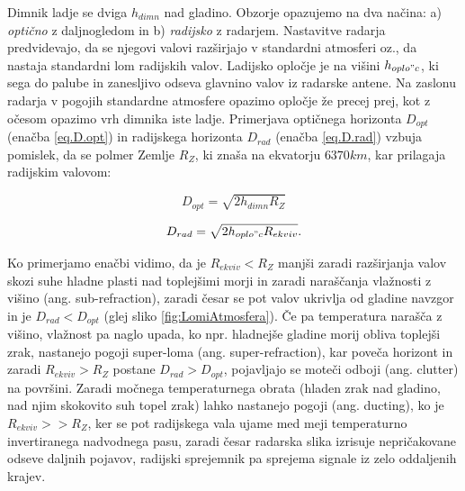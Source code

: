 Dimnik ladje se dviga $h_{dimn}$ nad gladino. Obzorje opazujemo na dva načina: a) \textit{optično} z daljnogledom in b) \textit{radijsko} z radarjem. Nastavitve radarja predvidevajo, da se njegovi valovi razširjajo v standardni atmosferi oz., da nastaja standardni lom radijskih valov. Ladijsko opločje je na višini $h_{oplo"c}$, ki sega do palube in zanesljivo odseva glavnino valov iz radarske antene. Na zaslonu radarja v pogojih standardne atmosfere opazimo opločje že precej prej, kot z očesom opazimo vrh dimnika iste ladje. Primerjava optičnega horizonta $D_{opt}$ (enačba \ref{eq.D.opt}) in radijskega horizonta $D_{rad}$ (enačba \ref{eq.D.rad}) vzbuja pomislek, da se polmer Zemlje $R_Z$, ki znaša na ekvatorju $6370km$, kar prilagaja radijskim valovom:

\begin{equation}\label{eq.D.opt}
D_{opt}=\sqrt{2h_{dimn}R_Z}
\end{equation}

\begin{equation}\label{eq.D.rad}
D_{rad}=\sqrt{2h_{oplo"c}R_{ekviv}}.
\end{equation}

Ko primerjamo enačbi vidimo, da je $R_{ekviv} < R_Z$ manjši zaradi razširjanja valov skozi suhe hladne plasti nad toplejšimi morji in zaradi naraščanja vlažnosti z višino (ang. sub-refraction), zaradi česar se pot valov ukrivlja od gladine navzgor in je $D_{rad} < D_{opt}$ (glej sliko \ref{fig:LomiAtmosfera}). Če pa temperatura narašča z višino, vlažnost pa naglo upada, ko npr. hladnejše gladine morij obliva toplejši zrak, nastanejo pogoji super-loma (ang. super-refraction), kar poveča horizont in zaradi $R_{ekviv} > R_Z$ postane $D_{rad} > D_{opt}$, pojavljajo se moteči odboji (ang. clutter) na površini. Zaradi močnega temperaturnega obrata (hladen zrak nad gladino, nad njim skokovito suh topel zrak) lahko nastanejo pogoji (ang. ducting), ko je $R_{ekviv} >> R_Z$, ker se pot radijskega vala ujame med meji temperaturno invertiranega nadvodnega pasu, zaradi česar radarska slika izrisuje nepričakovane odseve daljnih pojavov, radijski sprejemnik pa sprejema signale iz zelo oddaljenih krajev. 


